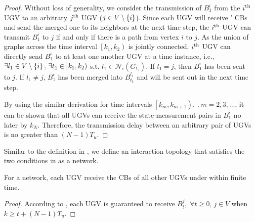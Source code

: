 	\begin{proof}				
		Without loss of generality, we consider the transmission of $B^i_1$ from the $i^\text{th}$ UGV to an arbitrary $j^\text{th}$ UGV ($j\in V\setminus \left\lbrace i\right\rbrace$).
		Since each UGV will receive \dnbhd' CBs and send the merged one to its neighbors at the next time step, the $i^\text{th}$ UGV can transmit $B^i_1$ to $j$ if and only if there is a path from vertex $i$ to $j$.
		As the union of graphs across the time interval $\left[k_1,k_2 \right)$ is jointly connected, $i^\text{th}$ UGV can directly send $B^i_1$ to at least one another UGV at a time instance, i.e., $\exists l_1\in V\setminus \left\lbrace i\right\rbrace,\, \exists t_1\in \left[k_1,k_2 \right)$ s.t. $l_1\in\mathcal{N}_{i}(G_{t_1})$.
		If $l_1=j$, then $B^i_1$ has been sent to $j$.
		If $l_1\neq j$, $B^i_1$ has been merged into $B^{l_1}_{t_1}$ and will be sent out in the next time step. 
		
		By using the similar derivation for time intervals $\left[k_m,k_{m+1} \right),\;,m=2,3,\dots$, it can be shown that all UGVs can receive the state-measurement pairs in $B^i_1$ no later by $k_{N}$.
		Therefore, the transmission delay between an arbitrary pair of UGVs is no greater than \small$(N-1)T_u$\normalsize.
	\end{proof}
	
	Similar to the definition in \cite{jadbabaie2003coordination}, we define an interaction topology that satisfies the two conditions in  as a \textit{{\fc}} network.

	\medskip
	\begin{cor}\label{cor1}
		For a {\fc} network, each UGV receive the CBs of all other UGVs under {\proto} within finite time. 
	\end{cor}
	\begin{proof}
		According to ,
		each UGV is guaranteed to receive $B^j_t,\; \forall t\ge 0,\, j\in V$ when \small$k\geq t+(N-1)T_u$\normalsize.
	\end{proof}
	
